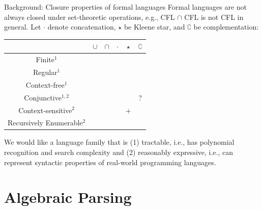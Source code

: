 \documentclass{beamer}
\newcommand{\cmark}{\ding{51}}%
\newcommand{\xmark}{\ding{55}}%
\begin{document}
\begin{frame}[fragile]{Background: Closure properties of formal languages}
  Formal languages are not always closed under set-theoretic operations, e.g., CFL $\cap$ CFL is not CFL in general. Let $\cdot$ denote concatenation, $\star$ be Kleene star, and $\complement$ be complementation:\\
  \begin{table}
    \begin{tabular}{c|ccccc}
      & $\cup$ & $\cap$ & $\cdot$ & $\star$ & $\complement$ \\
      \hline
      Finite$^1$                 & \cmark & \cmark & \cmark  & \cmark  & \cmark        \\
      Regular$^1$                & \cmark & \cmark & \cmark  & \cmark  & \cmark        \\
      Context-free$^1$           & \cmark & \xmark & \cmark  & \cmark  & \xmark        \\
      \rowcolor{slightgray} Conjunctive$^{1,2}$    & \cmark & \cmark & \cmark  & \cmark  & ?             \\
      Context-sensitive$^2$      & \cmark & \cmark & \cmark  & +       & \cmark        \\
      Recursively Enumerable$^2$ & \cmark & \cmark & \cmark  & \cmark  & \xmark        \\
    \end{tabular}
  \end{table}
  We would like a language family that is (1) tractable, i.e., has polynomial recognition and search complexity and (2) reasonably expressive, i.e., can represent syntactic properties of real-world programming languages.
\end{frame}

\section{Algebraic Parsing}\label{sec:algebraic-parsing}
\end{document}
